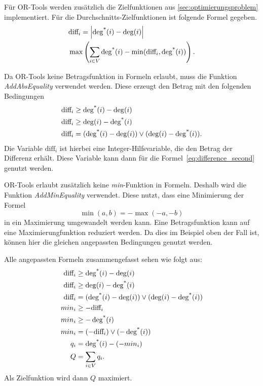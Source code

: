 Für OR-Tools werden zusätzlich die Zielfunktionen aus \cref{sec:optimierungsproblem} implementiert.
Für die Durchschnitts-Zielfunktionen ist folgende Formel gegeben.
\begin{align}
    &\text{diff}_i = \left| \operatorname{deg^*}(i) - \operatorname{deg}(i) \right|\label{eq:difference_second}\\
    &\max\left(\sum_{i\in V}\operatorname{deg^*}(i) - \min(\text{diff}_i, \operatorname{deg^*}(i))\right).
\end{align}

Da OR-Tools keine Betragsfunktion in Formeln erlaubt, muss die Funktion \emph{AddAbsEquality} verwendet werden.
Diese erzeugt den Betrag mit den folgenden Bedingungen
\begin{align*}
	\text{diff}_i &\geq \operatorname{deg^*}(i) - \operatorname{deg}(i) \\
	\text{diff}_i &\geq \operatorname{deg}(i) - \operatorname{deg^*}(i) \\
	\text{diff}_i &= (\operatorname{deg^*}(i) - \operatorname{deg}(i)) \lor (\operatorname{deg}(i) - \operatorname{deg^*}(i) ).
\end{align*}
Die Variable \(\text{diff}_i\) ist hierbei eine Integer-Hilfsvariable, die den Betrag der Differenz erhält.
Diese Variable kann dann für die Formel~\eqref{eq:difference_second} genutzt werden.

OR-Tools erlaubt zusätzlich keine \emph{min}-Funktion in Formeln. Deshalb wird die Funktion \emph{AddMinEquality} verwendet.
Diese nutzt, dass eine Minimierung der Formel
\[
	\min(a,b) = -\max(-a, -b)
\]
in ein Maximierung umgewandelt werden kann.
Eine Betragsfunktion kann auf eine Maximierungfunktion reduziert werden.
Da dies im Beispiel oben der Fall ist, können hier die gleichen angepassten Bedingungen genutzt werden.

Alle angepassten Formeln zusammengefasst sehen wie folgt aus:
\begin{align*}
	\text{diff}_i &\geq \operatorname{deg^*}(i) - \operatorname{deg}(i) \\
	\text{diff}_i &\geq \operatorname{deg}(i) - \operatorname{deg^*}(i) \\
	\text{diff}_i &= (\operatorname{deg^*}(i) - \operatorname{deg}(i)) \lor (\operatorname{deg}(i) - \operatorname{deg^*}(i) ) \\
	min_i &\geq - \text{diff}_i \\
	min_i &\geq - \operatorname{deg^*}(i) \\
	min_i &= (-\text{diff}_i) \lor (-\operatorname{deg^*}(i)) \\
	q_i &= \operatorname{deg^*}(i) - ( - min_i) \\
	Q &= \sum_{i \in V} q_i.
\end{align*}
Als Zielfunktion wird dann \(Q\) maximiert.

